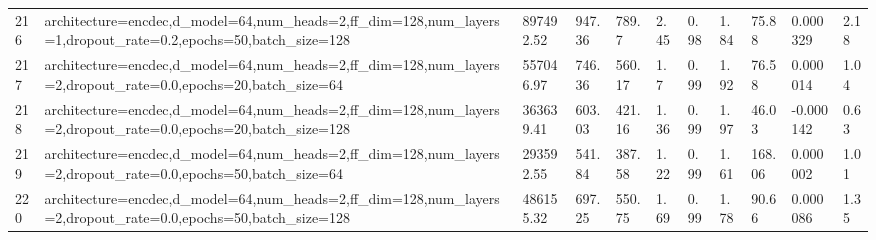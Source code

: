 \begin{longtable}{C{0.8cm} L{2cm} C{1.15cm} C{1.15cm} C{1.15cm} C{1.15cm} C{0.85cm} C{1.25cm} C{1.2cm} C{1.5cm} C{1.0cm}}
216 & architecture=encdec,\newline d\_model=64,\newline num\_heads=2,\newline ff\_dim=128,\newline num\_layers=1,\newline dropout\_rate=0.2,\newline epochs=50,\newline batch\_size=128 & 897492.52 & 947.36 & 789.7 & 2.45 & 0.98 & 1.84 & 75.88 & 0.000329 & 2.18 \\
217 & architecture=encdec,\newline d\_model=64,\newline num\_heads=2,\newline ff\_dim=128,\newline num\_layers=2,\newline dropout\_rate=0.0,\newline epochs=20,\newline batch\_size=64 & 557046.97 & 746.36 & 560.17 & 1.7 & 0.99 & 1.92 & 76.58 & 0.000014 & 1.04 \\
218 & architecture=encdec,\newline d\_model=64,\newline num\_heads=2,\newline ff\_dim=128,\newline num\_layers=2,\newline dropout\_rate=0.0,\newline epochs=20,\newline batch\_size=128 & 363639.41 & 603.03 & 421.16 & 1.36 & 0.99 & 1.97 & 46.03 & -0.000142 & 0.63 \\
219 & architecture=encdec,\newline d\_model=64,\newline num\_heads=2,\newline ff\_dim=128,\newline num\_layers=2,\newline dropout\_rate=0.0,\newline epochs=50,\newline batch\_size=64 & 293592.55 & 541.84 & 387.58 & 1.22 & 0.99 & 1.61 & 168.06 & 0.000002 & 1.01 \\
220 & architecture=encdec,\newline d\_model=64,\newline num\_heads=2,\newline ff\_dim=128,\newline num\_layers=2,\newline dropout\_rate=0.0,\newline epochs=50,\newline batch\_size=128 & 486155.32 & 697.25 & 550.75 & 1.69 & 0.99 & 1.78 & 90.66 & 0.000086 & 1.35 \\

\end{longtable}
